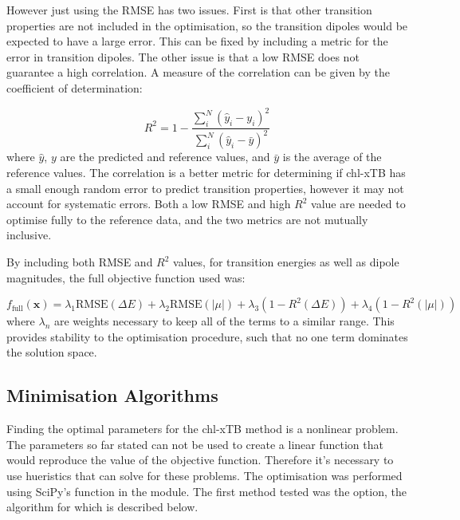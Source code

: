 However just using the RMSE has two issues. First is that other transition properties are not 
included in the optimisation, so the transition dipoles would be expected to have 
a large error. This can be fixed by including a metric for the error in transition dipoles.
The other issue is that a low RMSE does not guarantee a high correlation. A measure
of the correlation can be given by the coefficient of determination:

\begin{equation}
R^2 = 1 - \frac{\sum^N_i \left(\hat{y}_i - y_i \right)^2}{\sum^N_i \left(\hat{y}_i - \bar{y}\right)^2}
\end{equation}
%
where $\hat{y}$, $y$ are the predicted and reference values, and $\bar{y}$ is the
average of the reference values. The correlation is a better metric for determining
if chl-xTB has a small enough random error to predict transition properties, however
it may not account for systematic errors. Both a low RMSE and high $R^2$ value are
needed to optimise fully to the reference data, and the two metrics are not mutually
inclusive.

By including both RMSE and $R^2$ values, for transition energies as well as dipole
magnitudes, the full objective function used was:

\begin{equation}
f_{\text{full}} \left( \mathbf{x} \right) = \lambda_1 \text{RMSE} \left(\Delta E \right)+ \lambda_2 \text{RMSE}\left( \left| \mu \right| \right) + \lambda_3 \left(1 - R^2 \left( \Delta E \right)\right) + \lambda_4 \left( 1 - R^2 \left( \left| \mu \right| \right)\right)
\end{equation}
%
where $\lambda_n$ are weights necessary to keep all of the terms to a similar range.
This provides stability to the optimisation procedure, such that no one term dominates
the solution space.

\subsection{Minimisation Algorithms}
\label{subsec:algorithms}
Finding the optimal parameters for the chl-xTB method is a nonlinear problem. The
parameters so far stated can not be used to create a linear function that would
reproduce the value of the objective function. Therefore it's necessary to use
hueristics that can solve for these problems.
The optimisation was performed using SciPy's  function in the 
 module. The first method tested was the  option,
the algorithm for which is described below.

